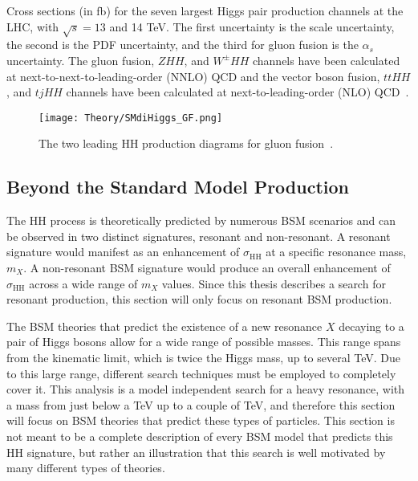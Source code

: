 \begin{table}[h!]
\begin{center}
    \caption{\label{tab:one} Cross sections (in fb) for the seven largest Higgs pair production channels at the LHC, with $\sqrt{s} = 13$ and 14 TeV. The first uncertainty is the scale uncertainty, the second is the PDF uncertainty, and the third for gluon fusion is the $\alpha_{s}$ uncertainty. The gluon fusion, $ZHH$, and $W^{\pm}HH$ channels have been calculated at next-to-next-to-leading-order (NNLO) QCD and the vector boson fusion, $ttHH$, and $tjHH$ channels have been calculated at next-to-leading-order (NLO) QCD~\cite{DiHiggsXsec}.}
\label{tab:DiHiggsXsec}
\end{center} 
\end{table}

\begin{figure}[h!]
\begin{center}
\texttt{[image: Theory/SMdiHiggs\_GF.png]}
\end{center}
\caption{The two leading HH production diagrams for gluon fusion~\cite{DiHiggsTheory}.}
\label{fig:GF_DiHiggs}
\end{figure}


\subsection{Beyond the Standard Model Production}
\label{sec:BSM_HH}

The HH process is theoretically predicted by numerous BSM scenarios and can be observed in two distinct signatures, resonant and non-resonant. A resonant signature would manifest as an enhancement of $\sigma_{\mathrm{HH}}$ at a specific resonance mass, $m_{X}$. A non-resonant BSM signature would produce an overall enhancement of $\sigma_{\mathrm{HH}}$ across a wide range of $m_{X}$ values. Since this thesis describes a search for resonant production, this section will only focus on resonant BSM production. 

The BSM theories that predict the existence of a new resonance $X$ decaying to a pair of Higgs bosons allow for a wide range of possible masses. This range spans from the kinematic limit, which is twice the Higgs mass, up to several TeV. Due to this large range, different search techniques must be employed to completely cover it. This analysis is a model independent search for a heavy resonance, with a mass from just below a TeV up to a couple of TeV, and therefore this section will focus on BSM theories that predict these types of particles. This section is not meant to be a complete description of every BSM model that predicts this HH signature, but rather an illustration that this search is well motivated by many different types of theories. 

